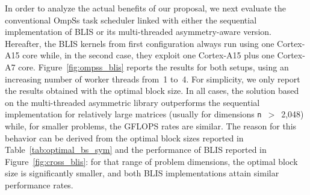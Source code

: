 In order to analyze the actual benefits of our proposal, we next evaluate the conventional 
OmpSs task scheduler linked with either the sequential implementation of BLIS or its multi-threaded asymmetry-aware version. 
Hereafter, the BLIS kernels from first configuration always run using one Cortex-A15 core while, in the second case,
they exploit one Cortex-A15 plus one Cortex-A7 core.
%
Figure~\ref{fig:ompss_blis} reports the results for both setups, using an increasing number 
of worker threads from~1 to~4. For simplicity, we only report the results obtained with the optimal block size. 
In all cases, the solution based on the multi-threaded asymmetric library outperforms the sequential implementation for 
relatively large matrices (usually for dimensions {\tt n}~$>$~2,048) while, for smaller problems, the GFLOPS rates are 
similar. The reason for this behavior can be derived from the optimal block sizes reported in  
Table~\ref{tab:optimal_bs_sym} and the performance of BLIS reported in Figure~\ref{fig:cross_blis}: for that range 
of problem dimensions, the optimal block size is significantly smaller, and both BLIS implementations attain similar
performance rates.

